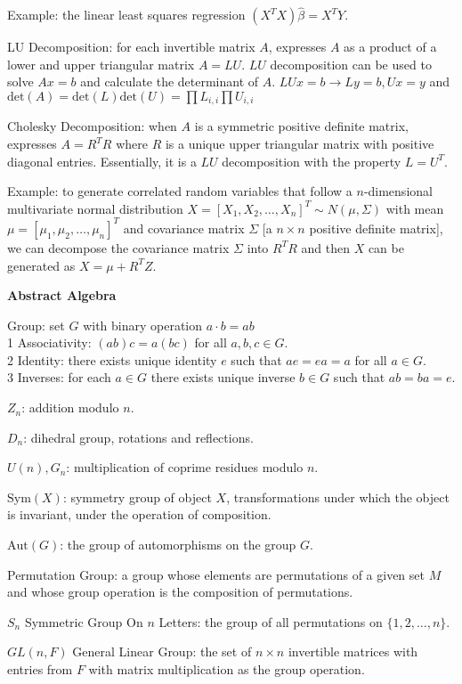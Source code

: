 Example: the linear least squares regression $(X^T X)\hat{\beta}=X^T Y$.

LU Decomposition: for each invertible matrix $A$, expresses $A$ as a product of a lower and upper triangular matrix $A=LU$. $LU$ decomposition can be used to solve $Ax=b$ and calculate the determinant of $A$. $LUx=b \to Ly=b, Ux=y$ and $\text{det}(A)=\text{det}(L)\text{det}(U)=\prod L_{i,i}\prod U_{i,i}$

Cholesky Decomposition: when $A$ is a symmetric positive definite matrix, expresses $A=R^T R$ where $R$ is a unique upper triangular matrix with positive diagonal entries. Essentially, it is a $LU$ decomposition with the property $L=U^T$.

Example: to generate correlated random variables that follow a $n$-dimensional multivariate normal distribution $X=[X_1,X_2,\dots,X_n]^T \sim N(\mu,\Sigma)$ with mean $\mu=[\mu_1,\mu_2,\dots,\mu_n]^T$ and covariance matrix $\Sigma$ [a $n \times n$ positive definite matrix], we can decompose the covariance matrix $\Sigma$ into $R^T R$ and then $X$ can be generated as $X=\mu + R^T Z$.

\newpage

\textbf{Abstract Algebra}

Group: set $G$ with binary operation $a \cdot b=ab$ \\
1 Associativity: $(ab)c=a(bc)$ for all $a,b,c \in G$. \\
2 Identity: there exists unique identity $e$ such that $ae=ea=a$ for all $a \in G$. \\
3 Inverses: for each $a \in G$ there exists unique inverse $b \in G$ such that $ab=ba=e$.

$Z_n$: addition modulo $n$.

$D_{n}$: dihedral group, rotations and reflections.

$U(n), G_n$: multiplication of coprime residues modulo $n$.

$\text{Sym}(X)$: symmetry group of object $X$, transformations under which the object is invariant, under the operation of composition.

$\text{Aut}(G)$: the group of automorphisms on the group $G$.

Permutation Group: a group whose elements are permutations of a given set $M$ and whose group operation is the composition of permutations.

$S_n$ Symmetric Group On $n$ Letters: the group of all permutations on $\{ 1,2,\dots,n \}$.

$GL(n,F)$ General Linear Group: the set of $n \times n$ invertible matrices with entries from $F$ with matrix multiplication as the group operation.


